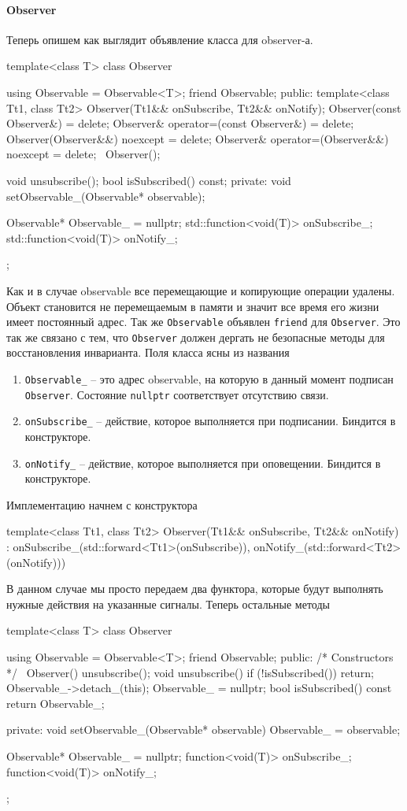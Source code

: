 \paragraph{Observer}

Теперь опишем как выглядит объявление класса для observer-а.
\begin{cppcode}
template<class T>
class Observer {
  using Observable = Observable<T>;
  friend Observable;
public:
  template<class Tt1, class Tt2>
  Observer(Tt1&& onSubscribe, Tt2&& onNotify);
  Observer(const Observer&) = delete;
  Observer& operator=(const Observer&) = delete;
  Observer(Observer&&) noexcept = delete;
  Observer& operator=(Observer&&) noexcept = delete;
  ~Observer();
  
  void unsubscribe();
  bool isSubscribed() const;
private:
  void setObservable_(Observable* observable);
  
  Observable* Observable_ = nullptr;
  std::function<void(T)> onSubscribe_;
  std::function<void(T)> onNotify_;
};
\end{cppcode}
Как и в случае observable все перемещающие и копирующие операции удалены.
Объект становится не перемещаемым в памяти и значит все время его жизни имеет постоянный адрес.
Так же \verb"Observable" объявлен \verb"friend" для \verb"Observer".
Это так же связано с тем, что \verb"Observer" должен дергать не безопасные методы для восстановления инварианта.
Поля класса ясны из названия
\begin{enumerate}
\item \verb"Observable_" -- это адрес observable, на которую в данный момент подписан \verb"Observer".
Состояние \verb"nullptr" соответствует отсутствию связи.

\item \verb"onSubscribe_" -- действие, которое выполняется при подписании.
Биндится в конструкторе.

\item \verb"onNotify_" -- действие, которое выполняется при оповещении.
Биндится в конструкторе.
\end{enumerate}
Имплементацию начнем с конструктора
\begin{cppcode}
template<class Tt1, class Tt2>
Observer(Tt1&& onSubscribe, Tt2&& onNotify)
  : onSubscribe_(std::forward<Tt1>(onSubscribe)),
    onNotify_(std::forward<Tt2>(onNotify))) {}
\end{cppcode}
В данном случае мы просто передаем два функтора, которые будут выполнять нужные действия на указанные сигналы.
Теперь остальные методы
\begin{cppcode}
template<class T>
class Observer {
  using Observable =
          Observable<T>;
  friend Observable;
public:
  /* Constructors */
  ~Observer() {
    unsubscribe();
  }
  void unsubscribe() {
    if (!isSubscribed())
      return;
    Observable_->detach_(this);
    Observable_ = nullptr;
  }
  bool isSubscribed() const {
    return Observable_;
  }
  
private:
  void setObservable_(Observable* observable) {
    Observable_ = observable;
  }
  
  Observable* Observable_ = nullptr;
  function<void(T)> onSubscribe_;
  function<void(T)> onNotify_;
};
\end{cppcode}

